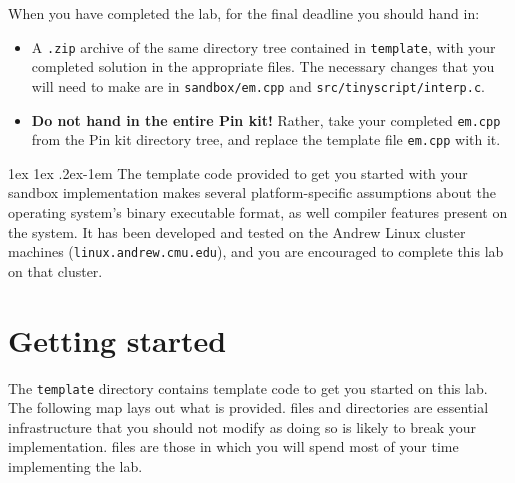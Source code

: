 \documentclass[11pt]{article}
\makeatletter
\renewcommand{\paragraph}{%
  \@startsection{paragraph}{4}%
  {\z@}{1ex \@plus 1ex \@minus .2ex}{-1em}%
  {\normalfont\normalsize\bfseries}
}
\makeatother
\begin{document}
When you have completed the lab, for the final deadline you should hand in:
\begin{itemize}[noitemsep,topsep=0pt]
\item A \verb'.zip' archive of the same directory tree contained in \verb'template', with your completed solution in the appropriate files. The necessary changes that you will need to make are in \verb'sandbox/em.cpp' and \verb'src/tinyscript/interp.c'. 
\item \textbf{Do not hand in the entire Pin kit!} Rather, take your completed \verb'em.cpp' from the Pin kit directory tree, and replace the template file \verb'em.cpp' with it.
\end{itemize}

\paragraph{\large \color{red}{Important!}} The template code provided to get you started with your sandbox implementation makes several platform-specific assumptions about the operating system's binary executable format, as well compiler features present on the system. It has been developed and tested on the Andrew Linux cluster machines (\verb'linux.andrew.cmu.edu'), and you are encouraged to complete this lab on that cluster.
\newpage

\section{Getting started}
\label{sect:start}

The \verb'template' directory contains template code to get you started on this lab. The following map lays out what is provided. {\color{red}{Red}} files and directories are essential infrastructure that you should not modify as doing so is likely to break your implementation. {\color{blue}{Blue}} files are those in which you will spend most of your time implementing the lab.
\\
\end{document}
